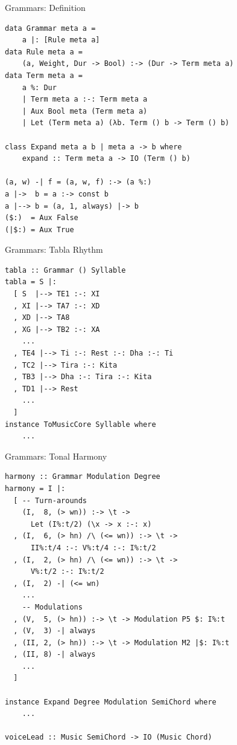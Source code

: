 \documentclass{beamer}
\begin{document}
	\begin{frame}[fragile=singleslide]{Grammars: Definition}
	\begin{verbatim}
data Grammar meta a =
    a |: [Rule meta a]
data Rule meta a =
    (a, Weight, Dur -> Bool) :-> (Dur -> Term meta a)
data Term meta a =
    a %: Dur
    | Term meta a :-: Term meta a
    | Aux Bool meta (Term meta a)
    | Let (Term meta a) (λb. Term () b -> Term () b)

class Expand meta a b | meta a -> b where
    expand :: Term meta a -> IO (Term () b)

(a, w) -| f = (a, w, f) :-> (a %:)
a |->  b = a :-> const b
a |--> b = (a, 1, always) |-> b
($:)  = Aux False
(|$:) = Aux True
	\end{verbatim}
	\end{frame}

	\begin{frame}[fragile=singleslide]{Grammars: Tabla Rhythm}
	\begin{verbatim}
tabla :: Grammar () Syllable
tabla = S |:
  [ S  |--> TE1 :-: XI
  , XI |--> TA7 :-: XD
  , XD |--> TA8
  , XG |--> TB2 :-: XA
    ...
  , TE4 |--> Ti :-: Rest :-: Dha :-: Ti
  , TC2 |--> Tira :-: Kita
  , TB3 |--> Dha :-: Tira :-: Kita
  , TD1 |--> Rest
    ...
  ]
instance ToMusicCore Syllable where
    ...
	\end{verbatim}
	\end{frame}

	\begin{frame}[fragile=singleslide]{Grammars: Tonal Harmony}
	\begin{verbatim}
harmony :: Grammar Modulation Degree
harmony = I |:
  [ -- Turn-arounds
    (I,  8, (> wn)) :-> \t ->
      Let (I%:t/2) (\x -> x :-: x)
  , (I,  6, (> hn) /\ (<= wn)) :-> \t ->
      II%:t/4 :-: V%:t/4 :-: I%:t/2
  , (I,  2, (> hn) /\ (<= wn)) :-> \t ->
      V%:t/2 :-: I%:t/2
  , (I,  2) -| (<= wn)
    ...
    -- Modulations
  , (V,  5, (> hn)) :-> \t -> Modulation P5 $: I%:t
  , (V,  3) -| always
  , (II, 2, (> hn)) :-> \t -> Modulation M2 |$: I%:t
  , (II, 8) -| always
    ...
  ]

instance Expand Degree Modulation SemiChord where
    ...

voiceLead :: Music SemiChord -> IO (Music Chord)
	\end{verbatim}
	\end{frame}
\end{document}
